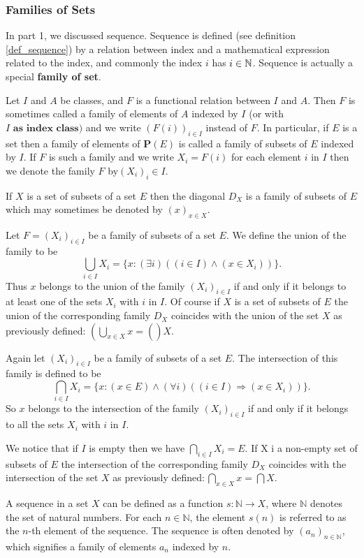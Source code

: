\subsubsection*{Families of Sets}
In part 1, we discussed sequence. Sequence is defined (see definition \ref{def_sequence}) by a relation between index and a mathematical expression related to the index, and commonly the index $i$ has $i\in \mathbb{N}$. Sequence is actually a special \textbf{family of set}.
\begin{definition}
	Let $I$ and $A$ be classes, and $F$ is a functional relation between $I$ and $A$. Then $F$ is sometimes called a family of elements of $A$ indexed by $I$ (or with $I\textbf{ as index class}) $ and we write $(F(i))_{i\in I}$ instead of $F$. In particular, if $E$ is a set then a family of elements of $\mathbf{P}(E)$ is called a family of subsets of $E$ indexed by $I.$ If $F$ is such a family and we write $X_i=F(i)$ for each element $i$ in $I$ then we denote the family $F$ by$\left ( X_i\right ) _i\in I.$
\end{definition} 
If $X$ is a set of subsets of a set $E$ then the diagonal $D_X$ is a family of subsets of $E$ which may sometimes be denoted by $(x)_{x\in X}.$

Let $F= ( X_{i}) _{i\in I}$ be a family of subsets of a set $E.$ We define the union of the family to be
$$
\bigcup_{i\in I}X_i=\{x:(\exists i)((i\in I)\land(x\in X_i))\}.
$$
Thus $x$ belongs to the union of the family $(X_i)_{i\in I}$ if and only if it belongs to at least one of the sets $X_i$ with $i$ in $I.$ Of course if $X$ is a set of subsets of $E$ the union of the corresponding family $D_X$ coincides with the union of the set $X$ as previously defined: $\left(\bigcup_{x\in X}x=\left(\right.\right)X.$

Again let $(X_i)_{i\in I}$ be a family of subsets of a set $E.$ The intersection of this family is defined to be
$$
\bigcap_{i\in I}X_i=\{x:(x\in E)\land(\forall i)((i\in I)\Longrightarrow(x\in X_i))\}.
$$
So $x$ belongs to the intersection of the family $(X_i)_{i\in I}$ if and only if it belongs to all the sets $X_i$ with $i$ in $I.$

We notice that if $I$ is empty then we have $\bigcap_{i\in I}X_i=E.$ If X i a non-empty set of subsets of $E$ the intersection of the corresponding family $D_X$ coincides with the intersection of the set $X$ as previously defined${: }\bigcap _{x\in X}x= \bigcap X.$


\begin{definition}
A sequence in a set \( X \) can be defined as a function \( s: \mathbb{N} \to X \), where \( \mathbb{N} \) denotes the set of natural numbers. For each \( n \in \mathbb{N} \), the element \( s(n) \) is referred to as the \( n \)-th element of the sequence. The sequence is often denoted by \( (a_n)_{n \in \mathbb{N}} \), which signifies a family of elements \( a_n \) indexed by \( n \).
\end{definition}
